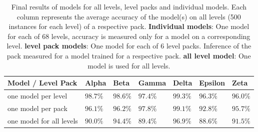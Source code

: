 \begin{table}[h]
\begin{tabular}{l| l l l l l l}
Model / Level Pack & Alpha & Beta & Gamma & Delta & Epsilon & Zeta
 \\ \hline
 one model per level & $98.7\%$ & $98.6\%$ & $97.4\%$ & $99.3\%$ & $96.3\%$ & $96.0\%$\\
 one model per pack & $96.1\%$& $96.2\%$ & $97.8\%$& $99.1\%$ & $92.8\%$ & $95.7\%$ \\
 one model for all levels & $90.0\%$ & $94.4\%$ & $89.4\%$ & $96.9\%$ & $88.6\%$ & $91.5\%$ \\
 \end{tabular}
 \caption{Final results of models for all levels, level packs and individual models. Each column represents the average accuracy of the model(s) on all levels (500 instances for each level) of a respective pack. \textbf{Individual models}: One model for each of 68 levels, accuracy is measured only for a model on a corresponding level. \textbf{level pack models}: One model for each of 6 level packs. Inference of the pack measured for a model trained for a respective pack. \textbf{all level model}: One model is used for all levels.}
 \label{final_model_results}
\end{table}

